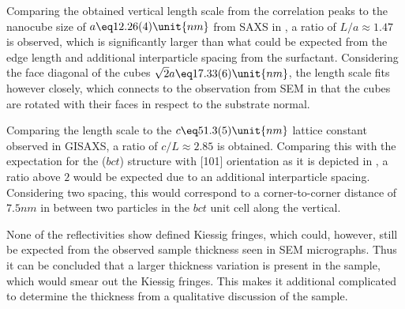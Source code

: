 \documentclass[\main/dresen_thesis.tex]{subfiles}
\begin{document}
  Comparing the obtained vertical length scale from the correlation peaks to the nanocube size of $a \eq 12.26(4) \unit{nm}$ from SAXS in , a ratio of $L/a \approx 1.47$ is observed, which is significantly larger than what could be expected from the edge length and additional interparticle spacing from the surfactant.
  Considering the face diagonal of the cubes $\sqrt{2} a \eq 17.33(6) \unit{nm}$, the length scale fits however closely, which connects to the observation from SEM in  that the cubes are rotated with their faces in respect to the substrate normal.

  Comparing the length scale to the $c\eq 51.3(5) \unit{nm}$ lattice constant observed in GISAXS, a ratio of  $c / L \approx 2.85$ is obtained.
  Comparing this with the expectation for the ($bct$) structure with [101] orientation as it is depicted in , a ratio above $2$ would be expected due to an additional interparticle spacing.
  Considering two spacing, this would correspond to a corner-to-corner distance of $7.5 \unit{nm}$ in between two particles in the $bct$ unit cell along the vertical.

  None of the reflectivities show defined Kiessig fringes, which could, however, still be expected from the observed sample thickness seen in SEM micrographs.
  Thus it can be concluded that a larger thickness variation is present in the sample, which would smear out the Kiessig fringes.
  This makes it additional complicated to determine the thickness from a qualitative discussion of the sample.
\end{document}
